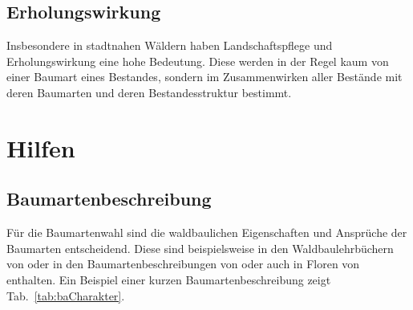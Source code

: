\documentclass[twocolumn]{scrartcl}
\begin{document}
\subsection{Erholungswirkung}
\label{ssec:erholung}

Insbesondere in stadtnahen Wäldern haben Landschaftspflege und
Erholungswirkung eine hohe Bedeutung. Diese werden in der Regel kaum von
einer Baumart eines Bestandes, sondern im Zusammenwirken aller Bestände
mit deren Baumarten und deren Bestandesstruktur bestimmt.

\section{Hilfen}
\label{sec:hilfen}

\subsection{Baumartenbeschreibung}
\label{sec:baBeschreibung}

Für die Baumartenwahl sind die waldbaulichen Eigenschaften und
Ansprüche der Baumarten entscheidend. Diese sind beispielsweise in den
Waldbaulehrbüchern von
\citet{mayer1992Waldbau,burschel2003Waldbau,Dengler2020Waldbau,tschermak1950Waldbau,rittershofer2006Waldbau,rubner1960Waldbau,koestler1950Waldbau,bauer1962WaldbauAlsWissenschaft}
oder in den Baumartenbeschreibungen von
\citet{eth2002MitteleuropaeischeWaldbaumarten,leibundgut1984Waldbaeume,ec2016baumartenatlas,hieke1989Dendrologie,mayr1906FremdlaendischeWaldUndParkbaeumeFuerEuropa,stimm2014EnyklopedieDerHolzgewaechse,schuett1993LexikonDerForstbotanik,fva2021Artensteckbrief,hempel1890BaeumeUStraeucher}
oder auch in Floren von
\citet{fischer2008Exkursionsflora,hegi1906IllustrierteFloraBd1,oberdorfer2001Exkursionsflora,rothmaler2021Exkursionsflora,schmeil2019Exkursionsflora,fitschen2017Gehoelzflora}
enthalten. Ein Beispiel einer kurzen Baumartenbeschreibung zeigt
Tab.~\ref{tab:baCharakter}.
\end{document}
